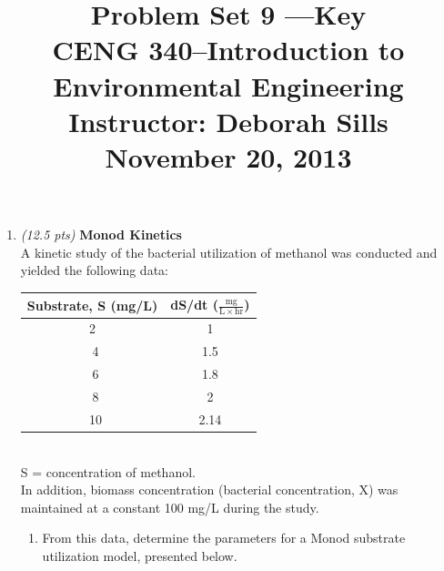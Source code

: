 \documentclass[12pt,letterpaper]{article}
\begin{document}
\setlength{\parindent}{0cm} 


\frenchspacing


\title {\Large{\textbf{Problem Set 9 ---Key}}\\ \large{CENG 340--Introduction to Environmental Engineering\\
Instructor: Deborah Sills\\ \textbf{November 20, 2013}}}

\author {}
\date {}
\maketitle

\vspace{-1in}

 


\begin{enumerate}


\item \emph{(12.5 pts)} \textbf{\large{Monod Kinetics}}\\
A kinetic study of the bacterial utilization of methanol was conducted and yielded the following data:\\

\begin{minipage}{\linewidth}
\centering
\begin{tabular}{|c|c|}\toprule[1.25pt]
\bf Substrate, S (mg/L)	& \bf dS/dt ($\mathrm{\frac{mg}{L\times hr}}$)	\\\midrule
2	& 1\\ \hline\
4	& 1.5\\ \hline\
6	& 1.8\\ \hline\
8	& 2\\ \hline\
10 & 2.14\\
\bottomrule[1.25pt]

\end {tabular}\par
\end{minipage}\\

S = concentration of methanol.\\

In addition, biomass concentration (bacterial concentration, X) was maintained at a constant 100 mg/L during the study. 

\begin{enumerate}

\item From this data, determine the parameters for a Monod substrate utilization model, presented below.


\end{enumerate}
\end{enumerate}
\end{document}
